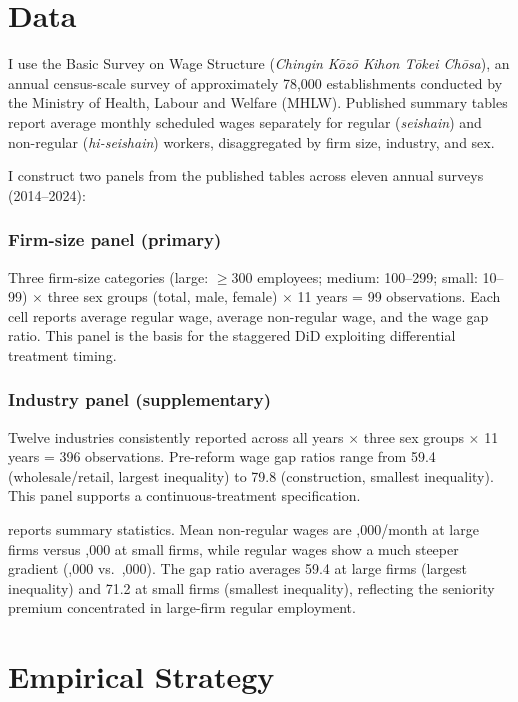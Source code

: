 \documentclass[12pt]{article}
\begin{document}
\section{Data}

I use the Basic Survey on Wage Structure (\textit{Chingin K\={o}z\={o} Kihon T\={o}kei Ch\={o}sa}), an annual census-scale survey of approximately 78,000 establishments conducted by the Ministry of Health, Labour and Welfare (MHLW). Published summary tables report average monthly scheduled wages separately for regular (\textit{seishain}) and non-regular (\textit{hi-seishain}) workers, disaggregated by firm size, industry, and sex.

I construct two panels from the published tables across eleven annual surveys (2014--2024):

\subsubsection*{Firm-size panel (primary)} Three firm-size categories (large: $\geq$300 employees; medium: 100--299; small: 10--99) $\times$ three sex groups (total, male, female) $\times$ 11 years = 99 observations. Each cell reports average regular wage, average non-regular wage, and the wage gap ratio. This panel is the basis for the staggered DiD exploiting differential treatment timing.

\subsubsection*{Industry panel (supplementary)} Twelve industries consistently reported across all years $\times$ three sex groups $\times$ 11 years = 396 observations. Pre-reform wage gap ratios range from 59.4 (wholesale/retail, largest inequality) to 79.8 (construction, smallest inequality). This panel supports a continuous-treatment specification.

 reports summary statistics. Mean non-regular wages are ,000/month at large firms versus ,000 at small firms, while regular wages show a much steeper gradient (,000 vs.\ ,000). The gap ratio averages 59.4 at large firms (largest inequality) and 71.2 at small firms (smallest inequality), reflecting the seniority premium concentrated in large-firm regular employment.



\section{Empirical Strategy}
\end{document}
